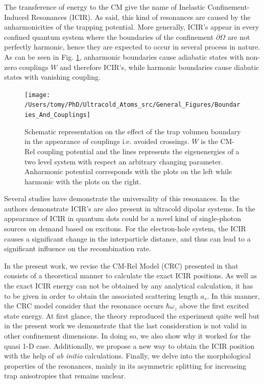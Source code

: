 \documentclass[aps,pre,twocolumn,superscriptaddress,showpacs]{revtex4-1}
\newcommand{\abinitio}{\textit{ab initio }}
\begin{document}
The transference of energy to the CM give the name of Inelastic Confinement-Induced Resonances (ICIR). As said, this kind of resonances are caused by the anharmonicities of the trapping potential. More generally, ICIR's appear in every confined quantum system where the boundaries of the confinement $\partial \Omega$ are not perfectly harmonic, hence they are expected to occur in several process in nature. As can be seen in Fig. \ref{fig:BandC}, anharmonic boundaries cause adiabatic states with non-zero couplings $W$ and therefore ICIR's, while harmonic boundaries cause diabatic states with vanishing coupling.
\begin{figure}[htbp!]
 \centering
\texttt{[image: /Users/tomy/PhD/Ultracold\_Atoms\_src/General\_Figures/Boundaries\_And\_Couplings]}
 \caption{Schematic representation on the effect of the trap volumen boundary in the appearance of couplings i.e. avoided crossings. $W$ is the CM-Rel coupling potential and the lines represents the eigenenergies of a two level system with respect an arbitrary changing parameter. Anharmonic potential corresponds with the plots on the left while harmonic with the plots on the right.}
 \label{fig:BandC}
 \end{figure}
 
 Several studies have demonstrate the universality of this resonances. In \cite{schulz2015resonances} the authors demonstrate  ICIR's are also present in ultracold dipolar systems. In \cite{Troppenz2015InelasticCR} the appearance of ICIR in quantum dots could be a novel kind of single-photon sources on demand based on excitons. For the electron-hole system, the ICIR causes a significant change in the interparticle distance, and thus can lead to a significant influence on the recombination rate. 

In the present work, we revise the CM-Rel Model (CRC) presented in \cite{PhysRevLett.109.073201} that consists of a theoretical manner to calculate the exact ICIR positions. As well as the exact ICIR energy can not be obtained by any analytical calculation, it has to be given in order to obtain the associated scattering length $a_s$. In this manner, the CRC model consider that the resonance occurs $\hbar \omega_z$ above the first excited state energy. At first glance, the theory reproduced the experiment quite well but in the present work we demonstrate that the last consideration is not valid in other confinement dimensions. In doing so, we also show why it worked for the quasi 1-D case. Additionally,  we propose a new way to obtain the ICIR position with the help of \abinitio calculations. Finally, we delve into the morphological properties of the resonances, mainly in its asymmetric splitting for increasing trap anisotropies that remains unclear. 
\end{document}
